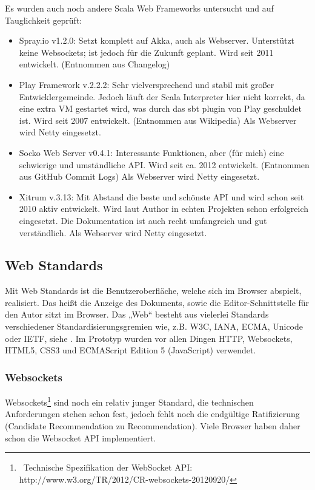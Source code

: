  
Es wurden auch noch andere Scala Web Frameworks untersucht und auf Tauglichkeit geprüft:

 
\begin{itemize}

\item Spray.io v1.2.0: Setzt komplett auf Akka, auch als Webserver. Unterstützt keine Websockets; ist jedoch für die Zukunft geplant. Wird seit 2011 entwickelt. (Entnommen aus Changelog)
\item Play Framework v.2.2.2: Sehr vielversprechend und stabil mit großer Entwicklergemeinde. Jedoch läuft der Scala Interpreter hier nicht korrekt, da eine extra VM gestartet wird, was durch das sbt plugin von Play geschuldet ist. Wird seit 2007 entwickelt. (Entnommen aus Wikipedia) Als Webserver wird Netty eingesetzt.
\item Socko Web Server v0.4.1: Interessante Funktionen, aber (für mich) eine schwierige und umständliche API. Wird seit ca. 2012 entwickelt. (Entnommen aus GitHub Commit Logs) Als Webserver wird Netty eingesetzt.
\item Xitrum v.3.13: Mit Abstand die beste und schönste API und wird schon seit 2010 aktiv entwickelt. Wird laut Author in echten Projekten schon erfolgreich eingesetzt. Die Dokumentation ist auch recht umfangreich und gut verständlich. Als Webserver wird Netty eingesetzt.
\end{itemize}
 
\subsection{Web Standards}\label{}
 
Mit Web Standards ist die Benutzeroberfläche, welche sich im Browser abspielt, realisiert. Das heißt die Anzeige des Dokuments, sowie die Editor-Schnittstelle für den Autor sitzt im Browser. Das „Web“ besteht aus vielerlei Standards verschiedener Standardisierungsgremien wie, z.B. W3C, IANA, ECMA, Unicode oder IETF, siehe \citep[S.~6]{Sikos}. Im Prototyp wurden vor allen Dingen HTTP, Websockets, HTML5, CSS3 und ECMAScript Edition 5 (JavaScript) verwendet.

 
\subsubsection{Websockets}\label{}

 
Websockets\footnote{~Technische Spezifikation der WebSocket API: http://www.w3.org/TR/2012/CR-websockets-20120920/} sind noch ein relativ junger Standard, die technischen Anforderungen stehen schon fest, jedoch fehlt noch die endgültige Ratifizierung (Candidate Recommendation zu Recommendation). Viele Browser haben daher schon die Websocket API implementiert.

